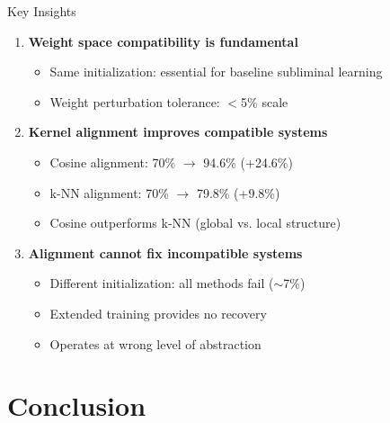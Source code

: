 \documentclass{beamer}
\begin{document}
\begin{frame}{Key Insights}

\begin{enumerate}
    \item \textbf{Weight space compatibility is fundamental}
    \begin{itemize}
        \item Same initialization: essential for baseline subliminal learning
        \item Weight perturbation tolerance: $<$5\% scale
    \end{itemize}

    \vspace{0.5em}

    \item \textbf{Kernel alignment improves compatible systems}
    \begin{itemize}
        \item Cosine alignment: 70\% $\to$ 94.6\% (+24.6\%)
        \item k-NN alignment: 70\% $\to$ 79.8\% (+9.8\%)
        \item Cosine outperforms k-NN (global vs. local structure)
    \end{itemize}

    \vspace{0.5em}

    \item \textbf{Alignment cannot fix incompatible systems}
    \begin{itemize}
        \item Different initialization: all methods fail ($\sim$7\%)
        \item Extended training provides no recovery
        \item Operates at wrong level of abstraction
    \end{itemize}
\end{enumerate}

\end{frame}

\section{Conclusion}
\end{document}
